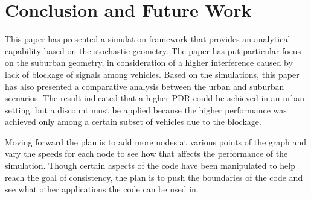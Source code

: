 \documentclass[journal]{IEEEtran}
\begin{document}
\section{Conclusion and Future Work}
This paper has presented a simulation framework that provides an analytical capability based on the stochastic geometry. The paper has put particular focus on the suburban geometry, in consideration of a higher interference caused by lack of blockage of signals among vehicles. Based on the simulations, this paper has also presented a comparative analysis between the urban and suburban scenarios. The result indicated that a higher PDR could be achieved in an urban setting, but a discount must be applied because the higher performance was achieved only among a certain subset of vehicles due to the blockage.

Moving forward the plan is to add more nodes at various points of the graph and vary the speeds for each node to see how that affects the performance of the simulation. Though certain aspects of the code have been manipulated to help reach the goal of consistency, the plan is to push the boundaries of the code and see what other applications the code can be used in.
\end{document}
